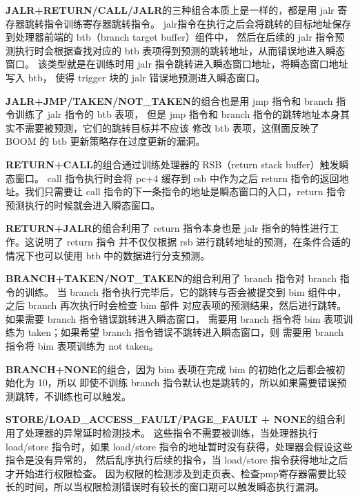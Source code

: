 \textbf{JALR+RETURN/CALL/JALR}的三种组合本质上是一样的，都是用 jalr 寄存器跳转指令训练寄存器跳转指令。
jalr指令在执行之后会将跳转的目标地址保存到处理器前端的 btb（branch target buffer）组件中，
然后在后续的 jalr 指令预测执行时会根据查找对应的 btb 表项得到预测的跳转地址，从而错误地进入瞬态窗口。
该类型就是在训练时用 jalr 指令跳转进入瞬态窗口地址，将瞬态窗口地址写入 btb，
使得 trigger 块的 jalr 错误地预测进入瞬态窗口。\par

\textbf{JALR+JMP/TAKEN/NOT\_TAKEN}的组合也是用 jmp 指令和 branch 指令训练了 jalr 指令的 btb 表项，
但是 jmp 指令和 branch 指令的跳转地址本身其实不需要被预测，它们的跳转目标并不应该
修改 btb 表项，这侧面反映了 BOOM 的 btb 更新策略存在过度更新的漏洞。\par

\textbf{RETURN+CALL}的组合通过训练处理器的 RSB（return stack buffer）触发瞬态窗口。
call 指令执行时会将 pc+4 缓存到 rsb 中作为之后 return 指令的返回地址。我们只需要让
call 指令的下一条指令的地址是瞬态窗口的入口，return 指令预测执行的时候就会进入瞬态窗口。\par

\textbf{RETURN+JALR}的组合利用了 return 指令本身也是 jalr 指令的特性进行工作。这说明了 return 指令
并不仅仅根据 rsb 进行跳转地址的预测，在条件合适的情况下也可以使用 btb 中的数据进行分支预测。\par

\textbf{BRANCH+TAKEN/NOT\_TAKEN}的组合利用了 branch 指令对 branch 指令的训练。
当 branch 指令执行完毕后，它的跳转与否会被提交到 bim 组件中，之后 branch 再次执行时会检查 bim 部件
对应表项的预测结果，然后进行跳转。如果需要 branch 指令错误跳转进入瞬态窗口，
需要用 branch 指令将 bim 表项训练为 taken；如果希望 branch 指令错误不跳转进入瞬态窗口，则
需要用 branch 指令将 bim 表项训练为 not taken。\par

\textbf{BRANCH+NONE}的组合，因为 bim 表项在完成 bim 的初始化之后都会被初始化为 10，所以
即使不训练 branch 指令默认也是跳转的，所以如果需要错误预测跳转，不训练也可以触发。\par

\textbf{STORE/LOAD\_ACCESS\_FAULT/PAGE\_FAULT + NONE}的组合利用了处理器的异常延时检测技术。
这些指令不需要被训练，当处理器执行 load/store 指令时，如果 load/store 指令的地址暂时没有获得，处理器会假设这些指令是没有异常的，
然后乱序执行后续的指令，当 load/store 指令获得地址之后才开始进行权限检查。
因为权限的检测涉及到走页表、检查pmp寄存器需要比较长的时间，所以当权限检测错误时有较长的窗口期可以触发瞬态执行漏洞。\par

